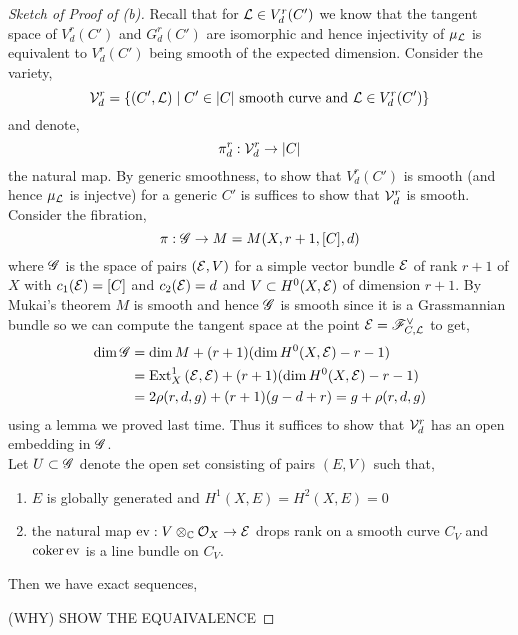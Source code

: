 \documentclass[12pt]{article}
\begin{document}
\begin{proof}[Sketch of Proof of (b)]
Recall that for $\mathcal{L} \in V^r_d(C')$ we know that the tangent space of $V^r_d(C')$ and $G^r_d(C')$ are isomorphic and hence injectivity of $\mu_{\mathcal{L}}$ is equivalent to $V^r_d(C')$ being smooth of the expected dimension.
Consider the variety,
\[ \mathcal{V}^r_d = \{ (C', \mathcal{L}) \mid C' \in |C| \text{ smooth curve and } \mathcal{L} \in V^r_d(C') \} \]
and denote,
\[ \pi^r_d : \mathcal{V}^r_d \to |C| \]
the natural map. By generic smoothness, to show that $V^r_d(C')$ is smooth (and hence $\mu_{\mathcal{L}}$ is injectve) for a generic $C'$ is suffices to show that $\mathcal{V}^r_d$ is smooth.
\bigskip\\
Consider the fibration,
\[ \pi : \mathscr{G} \to M = M(X, r+1, [C], d) \]
where $\mathscr{G}$ is the space of pairs $(\mathcal{E}, V)$ for a simple vector bundle $\mathcal{E}$ of rank $r+1$ of $X$ with $c_1(\mathcal{E}) = [C]$ and $c_2(\mathcal{E}) = d$ and $V \subset H^0(X, \mathcal{E})$ of dimension $r+1$. By Mukai's theorem $M$ is smooth and hence $\mathscr{G}$ is smooth since it is a Grassmannian bundle so we can compute the tangent space at the point $\mathcal{E} = \mathscr{F}_{C, \mathcal{L}}^\vee$ to get,
\begin{align*}
\dim{\mathscr{G}} & = \dim{M} + (r+1)(\dim{H^0(X, \mathcal{E})} - r - 1) 
\\
& = \mathrm{Ext}^{1}_{X} \left( \mathcal{E}, \mathcal{E} \right) + (r+1)(\dim{H^0(X, \mathcal{E})} - r - 1) 
\\
& = 2 \rho(r,d,g) + (r+1) (g - d + r) = g + \rho(r, d, g) 
\end{align*}
using a lemma we proved last time. Thus it suffices to show that $\mathcal{V}^r_d$ has an open embedding in $\mathscr{G}$.
\bigskip\\
Let $U \subset \mathscr{G}$ denote the open set consisting of pairs $(E, V)$ such that,
\begin{enumerate}
\item $E$ is globally generated and $H^1(X, E) = H^2(X, E) = 0$
\item the natural map $\mathrm{ev} : V \otimes_{\mathbb{C}} \mathcal{O}_{X} \to \mathcal{E}$ drops rank on a smooth curve $C_V$ and $\operatorname{\mathrm{coker}}{\mathrm{ev}}$ is a line bundle on $C_V$.
\end{enumerate}
Then we have exact sequences,
\begin{center}
\end{center}
(WHY) SHOW THE EQUAIVALENCE
\end{proof}
\end{document}
